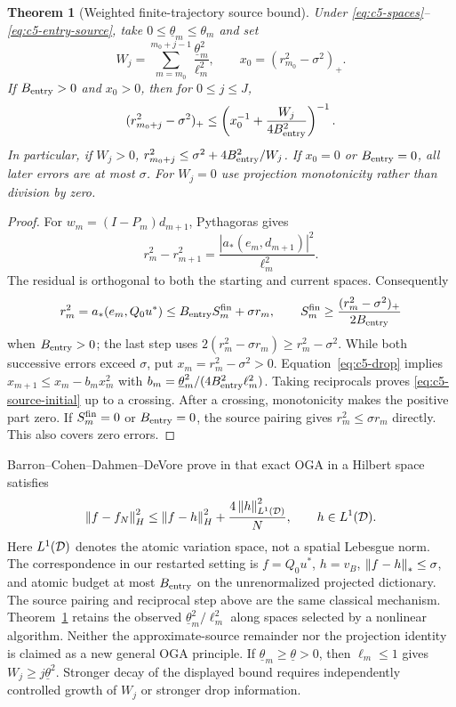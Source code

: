 \documentclass[11pt]{article}
\newtheorem{theorem}{Theorem}[section]
\theoremstyle{remark}
\begin{document}
\begin{theorem}[Weighted finite-trajectory source bound]
\label{thm:c5-source}
Under \eqref{eq:c5-spaces}--\eqref{eq:c5-entry-source}, take
$0\leq\underline\theta_m\leq\theta_m$ and set
\[
 W_j=\sum_{m=m_0}^{m_0+j-1}\frac{\underline\theta_m^2}{\ell_m^2},
 \qquad x_0=(r_{m_0}^2-\sigma^2)_+ .
\]
If $B_{\rm entry}>0$ and $x_0>0$, then for $0\leq j\leq J$,
\begin{equation}
 (r_{m_0+j}^2-\sigma^2)_+
 \leq\left(x_0^{-1}+\frac{W_j}{4B_{\rm entry}^2}\right)^{-1}.
 \label{eq:c5-source-initial}
\end{equation}
In particular, if $W_j>0$,
$r_{m_0+j}^2\leq\sigma^2+4B_{\rm entry}^2/W_j$.
If $x_0=0$ or $B_{\rm entry}=0$, all later errors are at most $\sigma$.
For $W_j=0$ use projection monotonicity rather than division by zero.
\end{theorem}
\begin{proof}
For $w_m=(I-P_m)d_{m+1}$, Pythagoras gives
\begin{equation}
 r_m^2-r_{m+1}^2
 =\frac{|a_*(e_m,d_{m+1})|^2}{\ell_m^2}.
 \label{eq:c5-drop}
\end{equation}
The residual is orthogonal to both the starting and current spaces.
Consequently
\[
 r_m^2=a_*(e_m,Q_0u^*)\leq B_{\rm entry}S_m^{\rm fin}+\sigma r_m,
 \qquad
 S_m^{\rm fin}\geq\frac{(r_m^2-\sigma^2)_+}{2B_{\rm entry}}
\]
when $B_{\rm entry}>0$; the last step uses
$2(r_m^2-\sigma r_m)\geq r_m^2-\sigma^2$.
While both successive errors exceed $\sigma$, put
$x_m=r_m^2-\sigma^2>0$. Equation~\eqref{eq:c5-drop} implies
$x_{m+1}\leq x_m-b_mx_m^2$ with
$b_m=\underline\theta_m^2/(4B_{\rm entry}^2\ell_m^2)$.
Taking reciprocals proves \eqref{eq:c5-source-initial} up to a crossing.
After a crossing, monotonicity makes the positive part zero.
If $S_m^{\rm fin}=0$ or $B_{\rm entry}=0$, the source pairing gives
$r_m^2\leq\sigma r_m$ directly. This also covers zero errors.
\end{proof}

Barron--Cohen--Dahmen--DeVore prove in
\cite[Theorem~2.3, equation~(2.31)]{BarronCohenDahmenDeVore2008}
that exact OGA in a Hilbert space satisfies
\begin{equation}
 \left\lVert f-f_N\right\rVert_H^2\leq\left\lVert f-h\right\rVert_H^2+
            \frac{4\left\lVert h\right\rVert_{L^1(\mathcal D)}^2}{N},\qquad h\in L^1(\mathcal D).
 \label{eq:c5-barron}
\end{equation}
Here $L^1(\mathcal D)$ denotes the atomic variation space, not a spatial
Lebesgue norm. The correspondence in our restarted setting is
$f=Q_0u^*$, $h=v_B$, $\left\lVert f-h\right\rVert_*\leq\sigma$, and atomic budget
at most $B_{\rm entry}$ on the unrenormalized projected dictionary.
The source pairing and reciprocal step above are the same classical
mechanism. Theorem~\ref{thm:c5-source} retains the observed
$\underline\theta_m^2/\ell_m^2$ along spaces selected by a nonlinear
algorithm. Neither the approximate-source remainder nor the projection
identity is claimed as a new general OGA principle.
If $\underline\theta_m\geq\underline\theta>0$, then $\ell_m\leq1$
gives $W_j\geq j\underline\theta^2$.
Stronger decay of the displayed bound requires independently controlled
growth of $W_j$ or stronger drop information.
\end{document}
